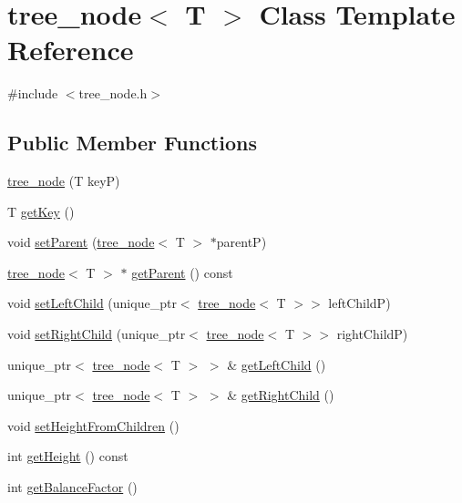 \hypertarget{classtree__node}{}\section{tree\+\_\+node$<$ T $>$ Class Template Reference}
\label{classtree__node}


{\ttfamily \#include $<$tree\+\_\+node.\+h$>$}

\subsection*{Public Member Functions}
\begin{DoxyCompactItemize}
\item 
\hyperlink{classtree__node_a776da4de6a1faef8b984f8b6dfe6eb6a}{tree\+\_\+node} (T keyP)
\item 
T \hyperlink{classtree__node_afbe2d91ad009570338290ed9eb8a7485}{get\+Key} ()
\item 
void \hyperlink{classtree__node_a1fe75baae3a5d9caa9cb886c54c291e2}{set\+Parent} (\hyperlink{classtree__node}{tree\+\_\+node}$<$ T $>$ $\ast$parentP)
\item 
\hyperlink{classtree__node}{tree\+\_\+node}$<$ T $>$ $\ast$ \hyperlink{classtree__node_aa17e609b57f77bb5446d83c964409ac4}{get\+Parent} () const
\item 
void \hyperlink{classtree__node_a3db979969a0fe8505ba65c7afabb5463}{set\+Left\+Child} (unique\+\_\+ptr$<$ \hyperlink{classtree__node}{tree\+\_\+node}$<$ T $>$$>$ left\+ChildP)
\item 
void \hyperlink{classtree__node_afea4c6595dafba65b5c4e59ca3da30f3}{set\+Right\+Child} (unique\+\_\+ptr$<$ \hyperlink{classtree__node}{tree\+\_\+node}$<$ T $>$$>$ right\+ChildP)
\item 
unique\+\_\+ptr$<$ \hyperlink{classtree__node}{tree\+\_\+node}$<$ T $>$ $>$ \& \hyperlink{classtree__node_ae161b70a3780e0cb3ecd4b57acc9e2d1}{get\+Left\+Child} ()
\item 
unique\+\_\+ptr$<$ \hyperlink{classtree__node}{tree\+\_\+node}$<$ T $>$ $>$ \& \hyperlink{classtree__node_a5e584d47f2c11941fe0406836fe50159}{get\+Right\+Child} ()
\item 
void \hyperlink{classtree__node_ab83ce531535bd54bdee8fd3ee9e4c128}{set\+Height\+From\+Children} ()
\item 
int \hyperlink{classtree__node_a57c8b2000ad0a13b67532b81ba73720b}{get\+Height} () const
\item 
int \hyperlink{classtree__node_ab69072fe36a848328440efcf5362bca1}{get\+Balance\+Factor} ()

\end{DoxyCompactItemize}
